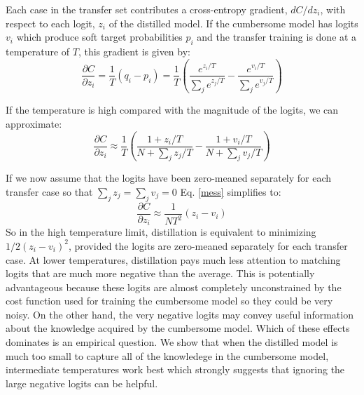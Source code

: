 Each case in the transfer set contributes a cross-entropy gradient, $dC/dz_i$, with respect to each logit, $z_i$ of the
distilled model.  If the cumbersome model has logits $v_i$ which produce soft target probabilities $p_i$ and the transfer training is done at a temperature of $T$,
this gradient is given by:
\begin{equation}
\frac{\partial C}{\partial z_i} = \frac{1}{T}\left(q_i - p_i\right) = \frac{1}{T}\left(\frac{e^{z_i/T}}{\sum_j e^{z_j/T}} -\frac{e^{v_i/T}}{\sum_j e^{v_j/T}}\right)
\label{deriv} 
\end{equation}

If the temperature is high compared with the magnitude of the logits, we can approximate:
\begin{equation}
\frac{\partial C}{\partial z_i} \approx \frac{1}{T}\left( \frac{1+z_i/T}{N + \sum_j z_j/T} - \frac{1+v_i/T}{N + \sum_j v_j/T} \right)
\label{mess}
\end{equation}

If we now assume that the logits have been zero-meaned separately for each transfer case so that $\sum_j z_j = \sum_j v_j = 0$ Eq. \ref{mess} simplifies to:
\begin{equation}
\frac{\partial C}{\partial z_i} \approx \frac{1}{NT^2}\left( z_i - v_i \right)
\label{nice}
\end{equation}
So in the high temperature limit, distillation is equivalent to
minimizing ${1/2}(z_i-v_i)^2$, provided the logits are zero-meaned
separately for each transfer case. At lower temperatures, distillation
pays much less attention to matching logits that are much more
negative than the average. This is potentially advantageous because
these logits are almost completely unconstrained by the cost function
used for training the cumbersome model so they could be very noisy.
On the other hand, the very negative logits may convey useful
information about the knowledge acquired by the cumbersome
model. Which of these effects dominates is an empirical question. We
show that when the distilled model is much too small to capture all of
the knowledege in the cumbersome model, intermediate temperatures work
best which strongly suggests that ignoring the large negative logits
can be helpful.


